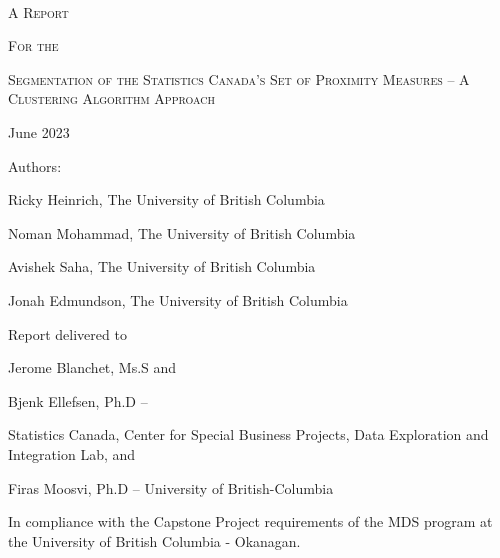 \documentclass[11pt, a4paper]{article}
\newcommand{\comment}[1]{}
\begin{document}
\begin{center}
$ $

\vspace{2 pc}
\textsc{A Report} \par
\small{\textsc{For the}} \par
\Large{\textsc{Segmentation of the Statistics Canada’s Set of Proximity Measures – A
Clustering Algorithm Approach}}
\par
\vspace{0.917 pc} %
\par
\normalsize{ }

\thispagestyle{firststyle}


\vspace{8 pc} %


\par
June 2023
\par
\vspace{10pc}

\begin{small}
Authors: \par
Ricky Heinrich, The University of British Columbia \par
Noman Mohammad, The University of British Columbia \par
Avishek Saha, The University of British Columbia \par
Jonah Edmundson, The University of British Columbia
\end{small}


\par
\vfill
\par
\begin{footnotesize}
Report delivered to \par
Jerome Blanchet, Ms.S and \par
Bjenk Ellefsen, Ph.D – \par
Statistics Canada, Center for Special Business Projects, Data Exploration and Integration Lab, and \par
Firas Moosvi, Ph.D – University of British-Columbia
\end{footnotesize}

\comment{
\noindent\small{Statistics Canada Liaison - Jérôme Blanchet, Bjenk Ellefsen}
\par
\noindent\small{UBCO Project Supervisor - His Excellency Dr. Firas Moosvi}
}
\par
\vspace{2pc}
\par
\noindent\tiny{In compliance with the Capstone Project requirements of the MDS program at the University of British Columbia - Okanagan.}
\end{center}
\normalsize
\end{document}
